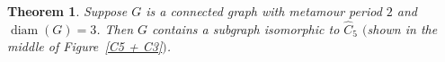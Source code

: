 \documentclass[12pt]{amsart}
\newtheorem{theorem}{Theorem}[section]
\newtheorem{corollary}[theorem]{Corollary}
\theoremstyle{definition}
\theoremstyle{remark}
\numberwithin{equation}{section}
\numberwithin{figure}{section}
\newcommand{\diam}{\operatorname{diam}}
\begin{document}


\begin{theorem} \label{thm: C5 with party hat}
    Suppose $G$ is a connected graph with metamour period $2$ and $\diam(G) = 3$. Then $G$ contains a subgraph isomorphic to $\widehat{C}_5$ $($shown in the middle of Figure~\ref{C5 + C3}$)$.
\end{theorem}
\end{document}
